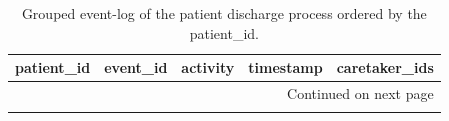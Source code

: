 \footnotesize 
\begin{longtable}{|l|l|l|l|l|}
\caption[Grouped event log]{Grouped event-log of the patient discharge process ordered by the patient\_id.}
\label{table:full_event_log} \\

\hline
 \textbf{patient\_id} & \textbf{event\_id} & \textbf{activity} & \textbf{timestamp} & \textbf{caretaker\_ids} \\ 
 \hline
 \endfirsthead
 \hline \multicolumn{5}{|r|}{{Continued on next page}} \\ \hline

 \endfoot

 \endlastfoot


\end{longtable}
